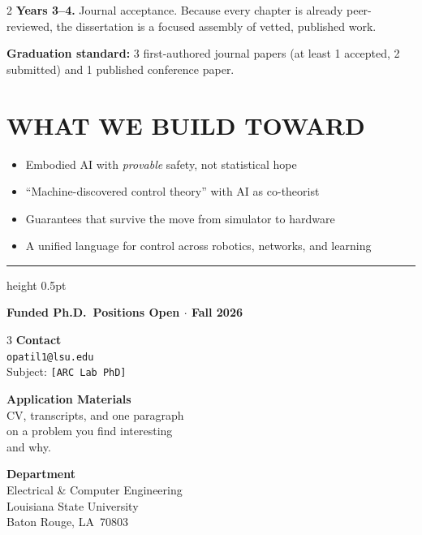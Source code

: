 \documentclass[9pt, letterpaper]{article}
\begin{document}
\begin{multicols}{2}
\textbf{Years 3--4.}
Journal acceptance.
Because every chapter is already peer-reviewed, the dissertation is a focused assembly
of vetted, published work.

\textbf{Graduation standard:} 3 first-authored journal papers (at least 1 accepted,
2 submitted) and 1 published conference paper.

\section{WHAT WE BUILD TOWARD}

\begin{itemize}
\item Embodied AI with \textit{provable} safety, not statistical hope
\item ``Machine-discovered control theory'' with AI as co-theorist
\item Guarantees that survive the move from simulator to hardware
\item A unified language for control across robotics, networks, and learning
\end{itemize}

\end{multicols}

\vspace{4pt}
{\color{lsupurple}\hrule height 0.5pt}
\vspace{5pt}

\begin{goldbox}
\begin{center}
{\color{lsupurple}\bfseries\large
  Funded Ph.D.\ Positions Open $\cdot$ Fall 2026}
\end{center}
\vspace{3pt}
\begin{multicols}{3}\centering\small
\textbf{Contact}\\[2pt]
\texttt{opatil1@lsu.edu}\\[1pt]
Subject: \texttt{[ARC Lab PhD]}

\columnbreak\centering
\textbf{Application Materials}\\[2pt]
CV, transcripts, and one paragraph\\
on a problem you find interesting\\
and why.

\columnbreak\centering
\textbf{Department}\\[2pt]
Electrical \& Computer Engineering\\
Louisiana State University\\
Baton Rouge, LA\ 70803
\end{multicols}
\end{goldbox}
\end{document}
